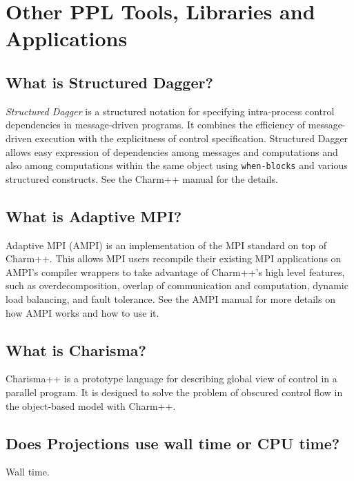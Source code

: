\section{Other PPL Tools, Libraries and Applications}

\subsection{What is Structured Dagger?}

{\em Structured Dagger} is a structured notation for specifying intra-process
control dependencies in message-driven programs. It combines the efficiency
of message-driven execution with the explicitness of control specification.
Structured Dagger allows easy expression of dependencies among messages
and computations and also among computations within the same object using
{\tt when-blocks}
and various structured constructs. See the Charm++ manual for the details.

\subsection{What is Adaptive MPI?}

Adaptive MPI (AMPI) is an implementation of the MPI standard on top of Charm++.
This allows MPI users recompile their existing MPI applications on AMPI's compiler
wrappers to take advantage of Charm++'s high level features, such as overdecomposition,
overlap of communication and computation, dynamic load balancing, and fault tolerance.
See the AMPI manual for more details on how AMPI works and how to use it.

\subsection{What is Charisma?}

Charisma++ is a prototype language for describing global view of control in a parallel program. It is designed to solve the problem of obscured control flow in the object-based model with Charm++.

\subsection{Does Projections use wall time or CPU time?}

Wall time.
